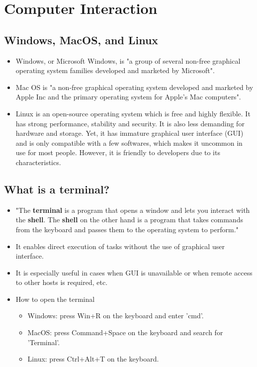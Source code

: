 \documentclass[11pt]{exam}
\begin{document}
\section{Computer Interaction}
\subsection{Windows, MacOS, and Linux}
\begin{itemize}
    \item Windows, or Microsoft Windows, is "a group of several non-free graphical operating system families developed and marketed by Microsoft".\cite{ref1}
    \item Mac OS is "a non-free graphical operating system developed and marketed by Apple Inc and the primary operating system for Apple's Mac computers".\cite{ref2}
    \item Linux is an open-source operating system which is free and highly flexible. It has strong performance, stability and security. It is also less demanding for hardware and storage. Yet, it has immature graphical user interface (GUI) and is only compatible with a few softwares, which makes it uncommon in use for most people. However, it is friendly to developers due to its characteristics.
\end{itemize}
\subsection{What is a terminal?}
\begin{itemize}
    \item "The \textbf{terminal} is a program that opens a window and lets you interact with the \textbf{shell}. The \textbf{shell} on the other hand is a program that takes commands from the keyboard and passes them to the operating system to perform."\cite{ref3}
    \item It enables direct execution of tasks without the use of graphical user interface.
    \item It is especially useful in cases when GUI is unavailable or when remote access to other hosts is required, etc.
    \item How to open the terminal
    \begin{itemize}
        \item Windows: press Win+R on the keyboard and enter 'cmd'.
        \item MacOS: press Command+Space on the keyboard and search for 'Terminal'.
        \item Linux: press Ctrl+Alt+T on the keyboard.
    \end{itemize}
\end{itemize}
\end{document}
